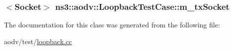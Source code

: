 \subsubsection[{\texorpdfstring{m\+\_\+tx\+Socket}{m_txSocket}}]{$<${\bf Socket}$>$ ns3\+::aodv\+::\+Loopback\+Test\+Case\+::m\+\_\+tx\+Socket\hspace{0.3cm}{\ttfamily [private]}}\hypertarget{classns3_1_1aodv_1_1LoopbackTestCase_ac0309c6d4ff6068bfba865f083d08794}{}\label{classns3_1_1aodv_1_1LoopbackTestCase_ac0309c6d4ff6068bfba865f083d08794}


The documentation for this class was generated from the following file\+:\begin{DoxyCompactItemize}
\item 
aodv/test/\hyperlink{loopback_8cc}{loopback.\+cc}\end{DoxyCompactItemize}
